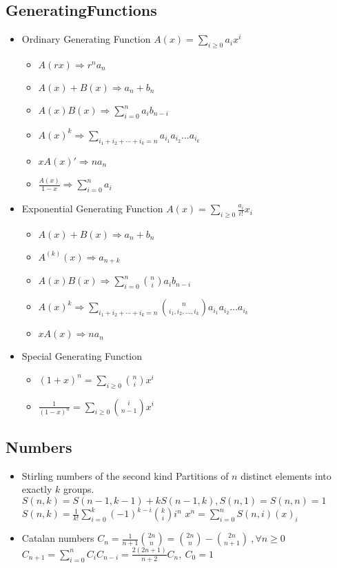 \documentclass[10pt, a4paper, twocolumn, oneside]{article}
\begin{document}
\subsection{GeneratingFunctions}
\begin{itemize}
\item Ordinary Generating Function
$A(x) = \sum_{i\ge 0} a_ix^i$
\begin{itemize}
    \itemsep-0.5em
    \item $A(rx)             \Rightarrow r^na_n$
    \item $A(x) + B(x)       \Rightarrow a_n + b_n$
    \item $A(x)B(x)          \Rightarrow \sum_{i=0}^{n} a_ib_{n-i}$
    \item $A(x)^k            \Rightarrow \sum_{i_1+i_2+\cdots+i_k=n} a_{i_1}a_{i_2}\ldots a_{i_k}$
    \item $xA(x)'            \Rightarrow na_n$
    \item $\frac{A(x)}{1-x}  \Rightarrow \sum_{i=0}^{n} a_i$
\end{itemize}
\item Exponential Generating Function
$A(x) = \sum_{i\ge 0} \frac{a_i}{i!}x_i$
\begin{itemize}
    \itemsep-0.5em
    \item $A(x) + B(x)       \Rightarrow a_n + b_n$
    \item $A^{(k)}(x)        \Rightarrow a_{n+k}$
    \item $A(x)B(x)          \Rightarrow \sum_{i=0}^{n} \binom{n}{i}a_ib_{n-i}$
    \item $A(x)^k            \Rightarrow \sum_{i_1+i_2+\cdots+i_k=n} \binom{n}{i_1, i_2, \ldots, i_k}a_{i_1}a_{i_2}\ldots a_{i_k}$
    \item $xA(x)             \Rightarrow na_n$
\end{itemize}
\item Special Generating Function
\begin{itemize}
    \itemsep-0.5em
    \item $(1+x)^n           = \sum_{i\ge 0} \binom{n}{i}x^i$
    \item $\frac{1}{(1-x)^n} = \sum_{i\ge 0} \binom{i}{n-1}x^i$
\end{itemize}
\end{itemize}
\subsection{Numbers}
\begin{itemize}
\item Stirling numbers of the second kind
Partitions of $n$ distinct elements into exactly $k$ groups. 
$S(n, k) = S(n - 1, k - 1) + kS(n - 1, k), S(n, 1) = S(n, n) = 1$
$S(n, k) = \frac{1}{k!}\sum_{i=0}^{k}(-1)^{k-i}{k \choose i}i^n$
$x^n     = \sum_{i=0}^{n} S(n, i) (x)_i$
\item Catalan numbers
$C_n = \frac{1}{n+1}\binom{2n}{n} = \binom{2n}{n}-\binom{2n}{n+1}\ , \forall n \geq 0 $
$C_{n+1} = \sum_{i=0}^{n} C_iC_{n-i} = \frac{2(2n+1)}{n+2}C_n,\ C_0 = 1$
\end{itemize}
\end{document}
